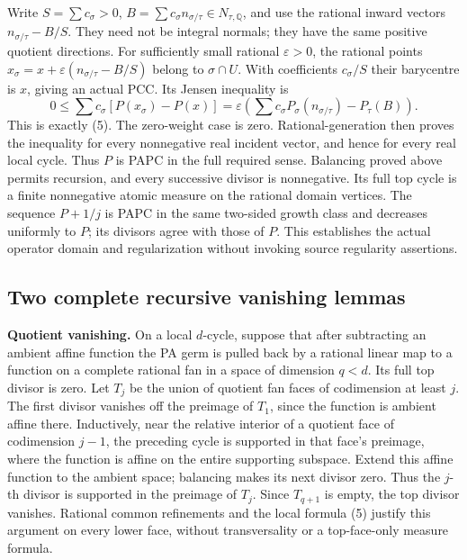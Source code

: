 \documentclass[
  11pt,
]{article}
\begin{document}
Write \(S=\sum c_\sigma>0\),
\(B=\sum c_\sigma n_{\sigma/\tau}\in N_{\tau,\mathbb{Q}}\), and use the
rational inward vectors \(n_{\sigma/\tau}-B/S\). They need not be
integral normals; they have the same positive quotient directions. For
sufficiently small rational \(\varepsilon>0\), the rational points
\(x_\sigma=x+\varepsilon(n_{\sigma/\tau}-B/S)\) belong to
\(\sigma\cap U\). With coefficients \(c_\sigma/S\) their barycentre is
\(x\), giving an actual PCC. Its Jensen inequality is \[
 0\leq\sum c_\sigma[P(x_\sigma)-P(x)]
       =\varepsilon\left(\sum c_\sigma P_\sigma(n_{\sigma/\tau})-P_\tau(B)\right).
\] This is exactly (5). The zero-weight case is zero.
Rational-generation then proves the inequality for every nonnegative
real incident vector, and hence for every real local cycle. Thus \(P\)
is PAPC in the full required sense. Balancing proved above permits
recursion, and every successive divisor is nonnegative. Its full top
cycle is a finite nonnegative atomic measure on the rational domain
vertices. The sequence \(P+1/j\) is PAPC in the same two-sided growth
class and decreases uniformly to \(P\); its divisors agree with those of
\(P\). This establishes the actual operator domain and regularization
without invoking source regularity assertions.

\subsection{Two complete recursive vanishing
lemmas}\label{two-complete-recursive-vanishing-lemmas}

\textbf{Quotient vanishing.} On a local \(d\)-cycle, suppose that after
subtracting an ambient affine function the PA germ is pulled back by a
rational linear map to a function on a complete rational fan in a space
of dimension \(q<d\). Its full top divisor is zero. Let \(T_j\) be the
union of quotient fan faces of codimension at least \(j\). The first
divisor vanishes off the preimage of \(T_1\), since the function is
ambient affine there. Inductively, near the relative interior of a
quotient face of codimension \(j-1\), the preceding cycle is supported
in that face's preimage, where the function is affine on the entire
supporting subspace. Extend this affine function to the ambient space;
balancing makes its next divisor zero. Thus the \(j\)-th divisor is
supported in the preimage of \(T_j\). Since \(T_{q+1}\) is empty, the
top divisor vanishes. Rational common refinements and the local formula
(5) justify this argument on every lower face, without transversality or
a top-face-only measure formula.
\end{document}
